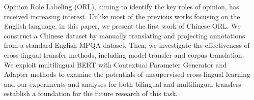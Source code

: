 Opinion Role Labeling (ORL), aiming to identify the key roles of opinion, has received increasing interest. Unlike most of the previous works focusing on the English language, in this paper, we present the first work of Chinese ORL. We construct a Chinese dataset by manually translating and projecting annotations from a standard English MPQA dataset. Then, we investigate the effectiveness of cross-lingual transfer methods, including model transfer and corpus translation. We exploit multilingual BERT with Contextual Parameter Generator and Adapter methods to examine the potentials of unsupervised cross-lingual learning and our experiments and analyses for both bilingual and multilingual transfers establish a foundation for the future research of this task.
